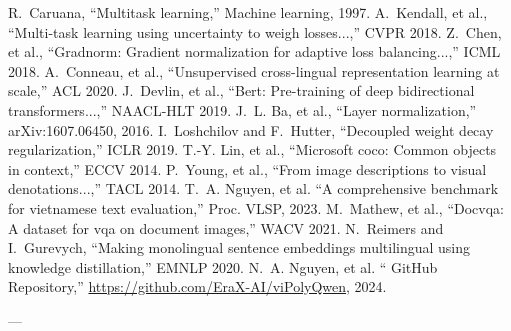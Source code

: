 \begin{thebibliography}{1}
 R.~Caruana, ``Multitask learning,'' Machine learning, 1997.
 A.~Kendall, et al., ``Multi-task learning using uncertainty to weigh losses...,'' CVPR 2018.
 Z.~Chen, et al., ``Gradnorm: Gradient normalization for adaptive loss balancing...,'' ICML 2018.
 A.~Conneau, et al., ``Unsupervised cross-lingual representation learning at scale,'' ACL 2020.
 J.~Devlin, et al., ``Bert: Pre-training of deep bidirectional transformers...,'' NAACL-HLT 2019.
 J.~L. Ba, et al., ``Layer normalization,'' arXiv:1607.06450, 2016.
 I.~Loshchilov and F.~Hutter, ``Decoupled weight decay regularization,'' ICLR 2019.
 T.-Y. Lin, et al., ``Microsoft coco: Common objects in context,'' ECCV 2014.
 P.~Young, et al., ``From image descriptions to visual denotations...,'' TACL 2014.
 T.~A. Nguyen, et al. ``A comprehensive benchmark for vietnamese text evaluation,'' Proc. VLSP, 2023. %
 M.~Mathew, et al., ``Docvqa: A dataset for vqa on document images,'' WACV 2021.
 N.~Reimers and I.~Gurevych, ``Making monolingual sentence embeddings multilingual using knowledge distillation,'' EMNLP 2020.
 N.~A. Nguyen, et al. ``\modelname{} GitHub Repository,'' \url{https://github.com/EraX-AI/viPolyQwen}, 2024.

\end{thebibliography}

---
